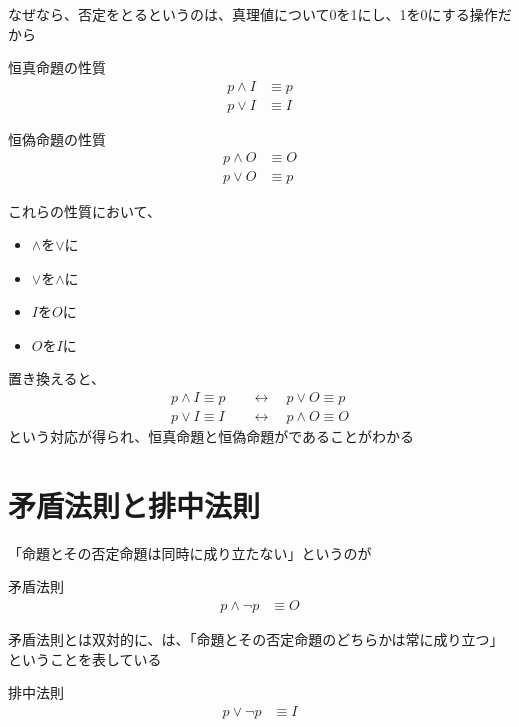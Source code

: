 \documentclass[b5paper,12pt]{jsarticle}
\begin{document}
なぜなら、否定をとるというのは、真理値について0を1にし、1を0にする操作だから

\sectionline

\begin{theorem}{恒真命題の性質}
  \begin{align*}
    p \land I & \equiv p \\
    p \lor I  & \equiv I
  \end{align*}
\end{theorem}

\begin{theorem}{恒偽命題の性質}
  \begin{align*}
    p \land O & \equiv O \\
    p \lor O  & \equiv p
  \end{align*}
\end{theorem}

これらの性質において、
\begin{itemize}
  \item $\land$を$\lor$に
  \item $\lor$を$\land$に
  \item $I$を$O$に
  \item $O$を$I$に
\end{itemize}
置き換えると、
\begin{align*}
  p \land I \equiv p & \quad\leftrightarrow\quad p \lor O \equiv p  \\
  p \lor I \equiv I  & \quad\leftrightarrow\quad p \land O \equiv O
\end{align*}
という対応が得られ、恒真命題と恒偽命題がであることがわかる

\sectionline
\section{矛盾法則と排中法則}

「命題とその否定命題は同時に成り立たない」というのが

\begin{theorem}{矛盾法則}
  \begin{align*}
    p \land \neg p & \equiv O
  \end{align*}
\end{theorem}

矛盾法則とは双対的に、は、「命題とその否定命題のどちらかは常に成り立つ」ということを表している

\begin{theorem}{排中法則}
  \begin{align*}
    p \lor \neg p & \equiv I
  \end{align*}
\end{theorem}
\end{document}
